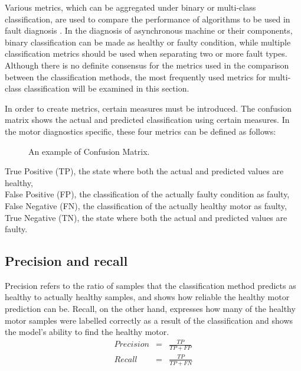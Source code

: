 Various metrics, which can be aggregated under binary or multi-class classification, are used to compare the performance of algorithms to be used in fault diagnosis \cite{canbek2017binary,seliya2009study}. In the diagnosis of asynchronous machine or their components, binary classification can be made as healthy or faulty condition, while multiple classification metrics should be used when separating two or more fault types.  Although there is no definite consensus for the metrics used in the comparison between the classification methods, the most frequently used metrics for multi-class classification will be examined in this section.

In order to create metrics, certain measures must be introduced. The confusion matrix shows the actual and predicted classification using certain measures. In the motor diagnostics specific, these four metrics can be defined as follows:
\begin{figure}[h]
	\centering
	\vspace{1cm}
	\caption{An example of Confusion Matrix.}	
	\label{confusion}
\end{figure}

True Positive (TP), the state where both the actual and predicted values are healthy,\\
False Positive (FP), the classification of the actually faulty condition as faulty, \\
False Negative (FN), the classification of the actually healthy motor as faulty,\\
True Negative (TN), the state where both the actual and predicted values are faulty.
\subsection{Precision and recall}

Precision refers to the ratio of samples that the classification method predicts as healthy to actually healthy samples, and shows how reliable the healthy motor prediction can be. Recall, on the other hand, expresses how many of the healthy motor samples were labelled correctly as a result of the classification and shows the model's ability to find the healthy motor. 
\begin{eqnarray}
\textit{Precision} &=& \displaystyle\frac{TP}{TP+FP}\\
\textit{Recall} &=& \displaystyle\frac{TP}{TP+FN} 
\label{precision}
\end{eqnarray}
